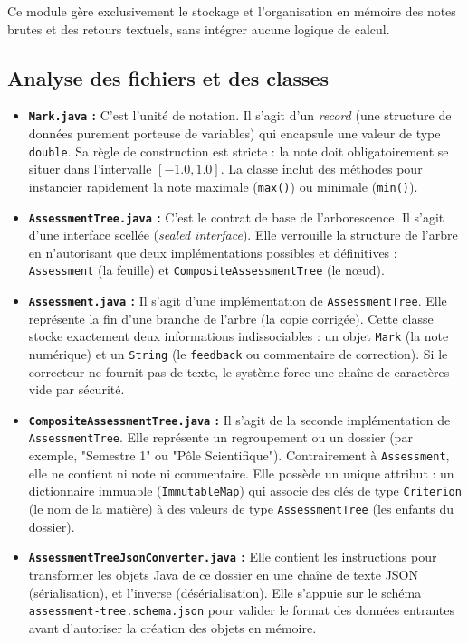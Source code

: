 \documentclass[11pt, a4paper]{article}
\begin{document}
Ce module gère exclusivement le stockage et l'organisation en mémoire des notes brutes et des retours textuels, sans intégrer aucune logique de calcul.

\subsection{Analyse des fichiers et des classes}

\begin{itemize}
    \item \textbf{\texttt{Mark.java} :} C'est l'unité de notation. Il s'agit d'un \textit{record} (une structure de données purement porteuse de variables) qui encapsule une valeur de type \texttt{double}. Sa règle de construction est stricte : la note doit obligatoirement se situer dans l'intervalle $[-1.0, 1.0]$. La classe inclut des méthodes pour instancier rapidement la note maximale (\texttt{max()}) ou minimale (\texttt{min()}).
    
    \item \textbf{\texttt{AssessmentTree.java} :} C'est le contrat de base de l'arborescence. Il s'agit d'une interface scellée (\textit{sealed interface}). Elle verrouille la structure de l'arbre en n'autorisant que deux implémentations possibles et définitives : \texttt{Assessment} (la feuille) et \texttt{CompositeAssessmentTree} (le nœud).
    
    \item \textbf{\texttt{Assessment.java} :} Il s'agit d'une implémentation de \texttt{AssessmentTree}. Elle représente la fin d'une branche de l'arbre (la copie corrigée). Cette classe stocke exactement deux informations indissociables : un objet \texttt{Mark} (la note numérique) et un \texttt{String} (le \texttt{feedback} ou commentaire de correction). Si le correcteur ne fournit pas de texte, le système force une chaîne de caractères vide par sécurité.
    
    \item \textbf{\texttt{CompositeAssessmentTree.java} :} Il s'agit de la seconde implémentation de \texttt{AssessmentTree}. Elle représente un regroupement ou un dossier (par exemple, "Semestre 1" ou "Pôle Scientifique"). Contrairement à \texttt{Assessment}, elle ne contient ni note ni commentaire. Elle possède un unique attribut : un dictionnaire immuable (\texttt{ImmutableMap}) qui associe des clés de type \texttt{Criterion} (le nom de la matière) à des valeurs de type \texttt{AssessmentTree} (les enfants du dossier).
    
    \item \textbf{\texttt{AssessmentTreeJsonConverter.java} :} Elle contient les instructions pour transformer les objets Java de ce dossier en une chaîne de texte JSON (sérialisation), et l'inverse (désérialisation). Elle s'appuie sur le schéma \texttt{assessment-tree.schema.json} pour valider le format des données entrantes avant d'autoriser la création des objets en mémoire.
\end{itemize}
\end{document}
